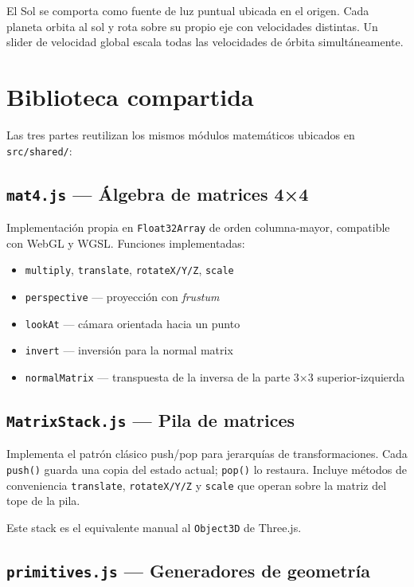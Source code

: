 \documentclass[12pt,a4paper]{article}
\begin{document}
El Sol se comporta como fuente de luz puntual ubicada en el origen. Cada planeta orbita al sol y rota sobre su propio eje con velocidades distintas. Un slider de velocidad global escala todas las velocidades de órbita simultáneamente.

\section{Biblioteca compartida}

Las tres partes reutilizan los mismos módulos matemáticos ubicados en \texttt{src/shared/}:

\subsection{\texttt{mat4.js} — Álgebra de matrices 4×4}

Implementación propia en \texttt{Float32Array} de orden columna-mayor, compatible con WebGL y WGSL. Funciones implementadas:

\begin{itemize}[leftmargin=*]
  \item \texttt{multiply}, \texttt{translate}, \texttt{rotateX/Y/Z}, \texttt{scale}
  \item \texttt{perspective} — proyección con \textit{frustum}
  \item \texttt{lookAt} — cámara orientada hacia un punto
  \item \texttt{invert} — inversión para la normal matrix
  \item \texttt{normalMatrix} — transpuesta de la inversa de la parte 3×3 superior-izquierda
\end{itemize}

\subsection{\texttt{MatrixStack.js} — Pila de matrices}

Implementa el patrón clásico push/pop para jerarquías de transformaciones. Cada \texttt{push()} guarda una copia del estado actual; \texttt{pop()} lo restaura. Incluye métodos de conveniencia \texttt{translate}, \texttt{rotateX/Y/Z} y \texttt{scale} que operan sobre la matriz del tope de la pila.

Este stack es el equivalente manual al \texttt{Object3D} de Three.js.

\subsection{\texttt{primitives.js} — Generadores de geometría}
\end{document}
